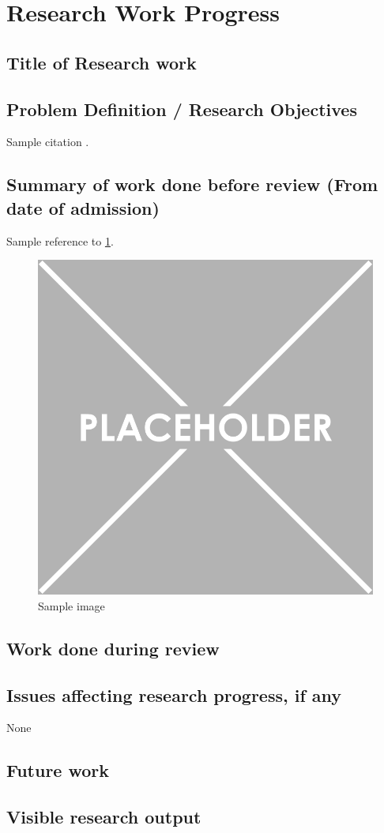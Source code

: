\documentclass[11pt]{article}
\begin{document}
\section{Research Work Progress}
\subsection{Title of Research work}

\subsection{Problem Definition / Research Objectives}
Sample citation \cite{Bagai1995a}.

\subsection{Summary of work done before review (From date of admission)}
Sample reference to \cref{fig:sampleimage}.

\begin{figure}[h]
	\centering
	\includegraphics[width=0.4\linewidth]{placeholder}
	\caption{Sample image}
	\label{fig:sampleimage}
\end{figure}

\subsection{Work done during review}

\subsection{Issues affecting research progress, if any}
None

\subsection{Future work}

\subsection{Visible research output}
\end{document}
